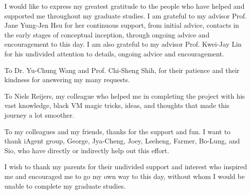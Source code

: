 \begin{acknowledgementsEN}

I would like to express my greatest gratitude to the people who have helped and supported me throughout my graduate studies. I am grateful to my advisor Prof. Jane Yung-Jen Hsu for her continuous support, from initial advice, contacts in the early stages of conceptual inception, through ongoing advice and encouragement to this day. I am also grateful to my advisor Prof. Kwei-Jay Lin for his undivided attention to details, ongoing advice and encouragement. 

\vspace{8mm}

To Dr. Yu-Chung Wang and Prof. Chi-Sheng Shih, for their patience and their kindness for answering my many requests.

\vspace{8mm}

To Niels Reijers, my colleague who helped me in completing the project with his vast knowledge, black VM magic tricks, ideas, and thoughts that made this journey a lot smoother.

\vspace{8mm}

To my colleagues and my friends, thanks for the support and fun. I want to thank iAgent group, George, Jya-Cheng, Joey, Leeheng, Farmer, Bo-Lung, and Sio, who have directly or indirectly help out this effort.

\vspace{8mm}

I wish to thank my parents for their undivided support and interest who inspired me and encouraged me to go my own way to this day, without whom I would be unable to complete my graduate studies.

\end{acknowledgementsEN}
